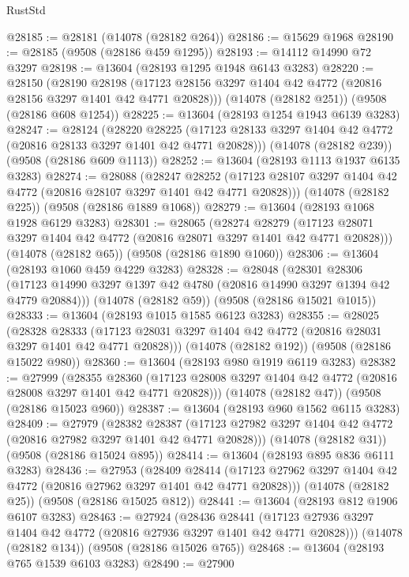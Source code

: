 \begin{lexlean}{RustStd}
\begin{coremodule}
@28185 := @28181 (@14078 (@28182 @264))
@28186 := @15629 @1968
@28190 := @28185 (@9508 (@28186 @459 @1295))
@28193 := @14112 @14990 @72 @3297
@28198 := @13604 (@28193 @1295 @1948 @6143 @3283)
@28220 := @28150
    (@28190
      @28198
      (@17123 @28156 @3297 @1404 @42 @4772 (@20816 @28156 @3297 @1401 @42 @4771 @20828)))
    (@14078 (@28182 @251))
    (@9508 (@28186 @608 @1254))
@28225 := @13604 (@28193 @1254 @1943 @6139 @3283)
@28247 := @28124
    (@28220
      @28225
      (@17123 @28133 @3297 @1404 @42 @4772 (@20816 @28133 @3297 @1401 @42 @4771 @20828)))
    (@14078 (@28182 @239))
    (@9508 (@28186 @609 @1113))
@28252 := @13604 (@28193 @1113 @1937 @6135 @3283)
@28274 := @28088
    (@28247
      @28252
      (@17123 @28107 @3297 @1404 @42 @4772 (@20816 @28107 @3297 @1401 @42 @4771 @20828)))
    (@14078 (@28182 @225))
    (@9508 (@28186 @1889 @1068))
@28279 := @13604 (@28193 @1068 @1928 @6129 @3283)
@28301 := @28065
    (@28274
      @28279
      (@17123 @28071 @3297 @1404 @42 @4772 (@20816 @28071 @3297 @1401 @42 @4771 @20828)))
    (@14078 (@28182 @65))
    (@9508 (@28186 @1890 @1060))
@28306 := @13604 (@28193 @1060 @459 @4229 @3283)
@28328 := @28048
    (@28301
      @28306
      (@17123 @14990 @3297 @1397 @42 @4780 (@20816 @14990 @3297 @1394 @42 @4779 @20884)))
    (@14078 (@28182 @59))
    (@9508 (@28186 @15021 @1015))
@28333 := @13604 (@28193 @1015 @1585 @6123 @3283)
@28355 := @28025
    (@28328
      @28333
      (@17123 @28031 @3297 @1404 @42 @4772 (@20816 @28031 @3297 @1401 @42 @4771 @20828)))
    (@14078 (@28182 @192))
    (@9508 (@28186 @15022 @980))
@28360 := @13604 (@28193 @980 @1919 @6119 @3283)
@28382 := @27999
    (@28355
      @28360
      (@17123 @28008 @3297 @1404 @42 @4772 (@20816 @28008 @3297 @1401 @42 @4771 @20828)))
    (@14078 (@28182 @47))
    (@9508 (@28186 @15023 @960))
@28387 := @13604 (@28193 @960 @1562 @6115 @3283)
@28409 := @27979
    (@28382
      @28387
      (@17123 @27982 @3297 @1404 @42 @4772 (@20816 @27982 @3297 @1401 @42 @4771 @20828)))
    (@14078 (@28182 @31))
    (@9508 (@28186 @15024 @895))
@28414 := @13604 (@28193 @895 @836 @6111 @3283)
@28436 := @27953
    (@28409
      @28414
      (@17123 @27962 @3297 @1404 @42 @4772 (@20816 @27962 @3297 @1401 @42 @4771 @20828)))
    (@14078 (@28182 @25))
    (@9508 (@28186 @15025 @812))
@28441 := @13604 (@28193 @812 @1906 @6107 @3283)
@28463 := @27924
    (@28436
      @28441
      (@17123 @27936 @3297 @1404 @42 @4772 (@20816 @27936 @3297 @1401 @42 @4771 @20828)))
    (@14078 (@28182 @134))
    (@9508 (@28186 @15026 @765))
@28468 := @13604 (@28193 @765 @1539 @6103 @3283)
@28490 := @27900

\end{coremodule}
\end{lexlean}

